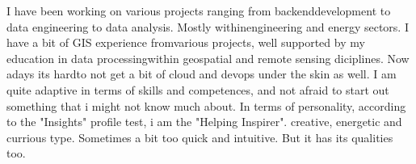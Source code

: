 
I have been working on various projects ranging from backenddevelopment to data engineering to data analysis. 
Mostly withinengineering and energy sectors. 
I have a bit of GIS experience fromvarious projects, well supported by my education in data processingwithin geospatial and remote sensing diciplines. 
Now adays its hardto not get a bit of cloud and devops under the skin as well. 
I am quite adaptive in terms of skills and competences, and not afraid to start out something that i might not know much about. 
In terms of personality, according to the "Insights" profile test, i am the "Helping Inspirer". 
creative, energetic and currious type. Sometimes a bit too quick and intuitive. But it has its qualities too.
